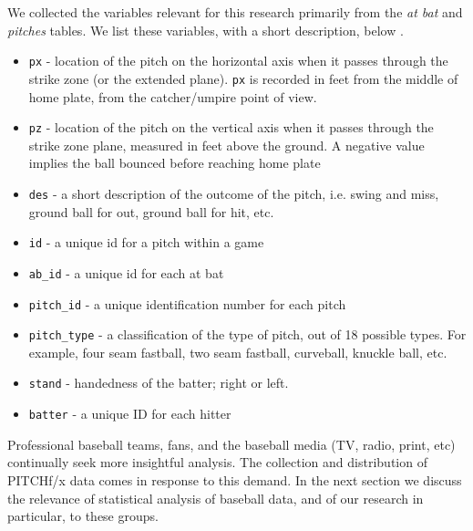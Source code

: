 We collected the variables relevant for this research primarily from the {\it at bat} and {\it pitches} tables. We list these variables, with a short description, below \citep{Fast2007}.
  \begin{itemize}
  \item \verb|px| - location of the pitch on the horizontal axis when it passes through the strike zone (or the extended plane). \verb|px| is recorded in feet from the middle of home plate, from the catcher/umpire point of view.
  \item \verb|pz| - location of the pitch on the vertical axis when it passes through the strike zone plane, measured in feet above the ground. A negative value implies the ball bounced before reaching home plate
  \item \verb|des| - a short description of the outcome of the pitch, i.e. swing and miss, ground ball for out, ground ball for hit, etc.  
  \item \verb|id| - a unique id for a pitch within a game
  \item \verb|ab_id| - a unique id for each at bat  
  \item \verb|pitch_id| - a unique identification number for each pitch
  \item \verb|pitch_type| - a classification of the type of pitch, out of 18 possible types. For example, four seam fastball, two seam fastball, curveball, knuckle ball, etc.
  \item \verb|stand| - handedness of the batter; right or left.
  \item \verb|batter| - a unique ID for each hitter
  \end{itemize}


Professional baseball teams, fans, and the baseball media (TV, radio, print, etc)  continually seek more insightful analysis. The collection and distribution of PITCHf/x\textsuperscript{\textregistered} data comes in response to this demand. In the next section we discuss the relevance of statistical analysis of baseball data, and of our research in particular, to these groups.

